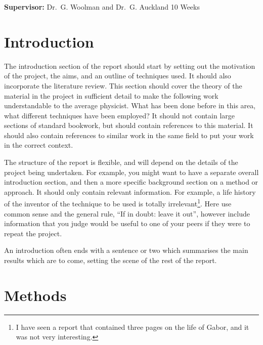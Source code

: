 \documentclass[a4paper,12pt]{article}
\begin{document}
\vfill
{\bf Supervisor:} Dr.\ G. Woolman and Dr.\ G. Auckland                %
\hfill
10 Weeks                                         %
\newpage
%
\pagestyle{plain}                               %
\setcounter{page}{1}                            %
\tableofcontents                                %
\section{Introduction}

The introduction section of the report should start by setting out the
motivation of the project, the aims, and an outline of techniques used.
It should also incorporate the literature review. This section should 
cover the theory of the material in the project in sufficient detail to 
make the following work understandable to the average physicist. What has 
been done before in this area, what different techniques have been 
employed? It should not contain large sections of standard
bookwork, but should contain references to this material. It should also 
contain references to similar work in the same field to put your work in 
the correct context.

The structure of the report is flexible, and will depend on the details
of the project being undertaken. For example, you might want to have a 
separate overall introduction section, and then a more specific background section 
on a method or approach. It should only contain relevant information. For example, 
a life history of the inventor of the technique to be used is
totally irrelevant\footnote{I have seen a report that contained three pages
on the life of Gabor, and it was not very interesting.}. Here use common sense
and the general rule, ``If in doubt: leave it out'', however
include information that you judge would be useful to one of your
peers if they were to repeat the project.

An introduction often ends with a sentence or two which summarises the main
results which are to come, setting the scene of the rest of the report. 




\section{Methods}
\end{document}

